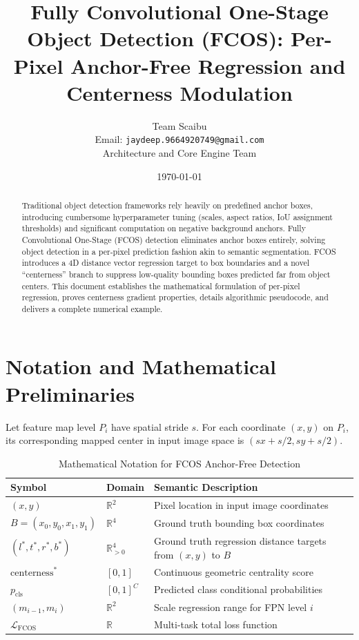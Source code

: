 \documentclass[11pt,a4paper]{article}
\title{Fully Convolutional One-Stage Object Detection (FCOS): Per-Pixel Anchor-Free Regression and Centerness Modulation}
\author{Team Scaibu \\ \small Email: \texttt{jaydeep.9664920749@gmail.com} \\ \small Architecture and Core Engine Team}
\date{\today}
\theoremstyle{definition}
\begin{document}
\maketitle

\begin{abstract}
Traditional object detection frameworks rely heavily on predefined anchor boxes, introducing cumbersome hyperparameter tuning (scales, aspect ratios, IoU assignment thresholds) and significant computation on negative background anchors. Fully Convolutional One-Stage (FCOS) detection eliminates anchor boxes entirely, solving object detection in a per-pixel prediction fashion akin to semantic segmentation. FCOS introduces a 4D distance vector regression target to box boundaries and a novel ``centerness'' branch to suppress low-quality bounding boxes predicted far from object centers. This document establishes the mathematical formulation of per-pixel regression, proves centerness gradient properties, details algorithmic pseudocode, and delivers a complete numerical example.
\end{abstract}

\section{Notation and Mathematical Preliminaries}

Let feature map level $P_i$ have spatial stride $s$. For each coordinate $(x, y)$ on $P_i$, its corresponding mapped center in input image space is $(s x + s/2, s y + s/2)$.

\begin{table}[h]
\centering
\caption{Mathematical Notation for FCOS Anchor-Free Detection}
\begin{tabular}{lll}
\toprule
\textbf{Symbol} & \textbf{Domain} & \textbf{Semantic Description} \\
\midrule
$(x, y)$ & $\mathbb{R}^2$ & Pixel location in input image coordinates \\
$B = (x_0, y_0, x_1, y_1)$ & $\mathbb{R}^4$ & Ground truth bounding box coordinates \\
$(l^*, t^*, r^*, b^*)$ & $\mathbb{R}_{> 0}^4$ & Ground truth regression distance targets from $(x, y)$ to $B$ \\
$\text{centerness}^*$ & $[0, 1]$ & Continuous geometric centrality score \\
$p_{\text{cls}}$ & $[0, 1]^C$ & Predicted class conditional probabilities \\
$(m_{i-1}, m_i)$ & $\mathbb{R}^2$ & Scale regression range for FPN level $i$ \\
$\mathcal{L}_{\text{FCOS}}$ & $\mathbb{R}$ & Multi-task total loss function \\
\bottomrule
\end{tabular}
\end{table}
\end{document}
